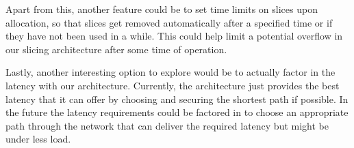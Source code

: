 Apart from this, another feature could be to set time limits on slices upon allocation, so that slices get removed automatically after a specified time or if they have not been used in a while. This could help limit a potential overflow in our slicing architecture after some time of operation.

Lastly, another interesting option to explore would be to actually factor in the \gls{latency} with our architecture. Currently, the architecture just provides the best \gls{latency} that it can offer by choosing and securing the shortest path if possible. In the future the \gls{latency} requirements could be factored in to choose an appropriate path through the network that can deliver the required \gls{latency} but might be under less load.